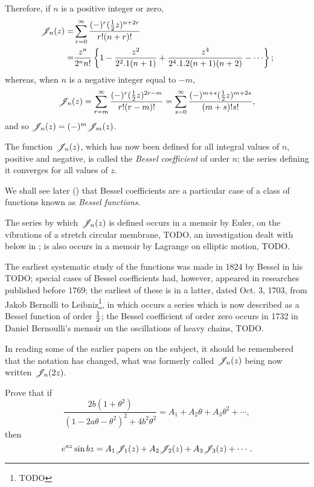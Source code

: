 \documentclass{book}
\begin{document}
Therefore, if $n$ is a positive integer or zero, 
\begin{align*}
\besJ_n(z) =& \sum_{r=0}^{\infty} \frac{ (-)^r (\half z)^{n+2r} }{
  r!(n+r)! } \\
=& \frac{ z^n }{ 2^n n! } 
\thebrace{ 1 - \frac{z^2}{2^2.1(n+1)} + \frac{z^4}{2^4.1.2(n+1)(n+2)}
  - \cdots };
\end{align*}
%
%
whereas, when $n$ is a negative integer equal to $-m$,
$$
\mathscr{J}_n(z)
= \sum_{r=m}^{\infty} \frac{ (-)^r (\frac{1}{2} z)^{2r-m} }{ r!(r-m)!  }
  = \sum_{s=0}^{\infty} \frac{ (-)^{m+s} (\frac{1}{2} z)^{m+2s}  }{ (m+s)! s!  },
  $$
  and so $\mathscr{J}_n(z) = (-)^m \mathscr{J}_m(z)$.

The function $\mathscr{J}_n(z)$, which has now been defined for all integral
values of $n$, positive and negative, is called the
\emph{Bessel coefficient} of order $n$; the series defining it 
converges for all values of $z$.

We shall see later () that Bessel
coefficients are a particular case of a class of functions known as
\emph{Bessel functions}.

The series by which $\mathscr{J}_n(z)$ is defined occurs in a memoir by Euler,
on the vibrations of a stretch circular membrane, TODO, 
an investigation dealt with below in ;
is also occurs in a memoir by Lagrange on elliptic motion, TODO.

The earliest systematic study of the functions was made in 1824 by
Bessel in his TODO; special cases of Bessel coefficients had, however,
appeared in researches published before 1769; the earliest of these is
in a latter, dated Oct. 3, 1703, from Jakob Bernolli to
Leibniz\footnote{TODO}, in which occurs a series which is now
described as a Bessel function of order $\frac{1}{2}$; the Bessel
coefficient of order zero occurs in 1732 in Daniel Bernoulli's memoir
on the oscillations of heavy chains, TODO.

In reading some of the earlier papers on the subject, it should be
remembered that the notation has changed, what was formerly called
$\mathscr{J}_n(z)$ being now written $\mathscr{J}_n(2z)$.
\begin{wandwexample}
Prove that if 
$$
\frac{ 2b(1+\theta^2)  }{ (1-2a\theta-\theta^2)^2 + 4b^2\theta^2  }
=
A_1 + A_2 \theta + A_3 \theta^2 + \cdots,
$$
then
$$
e^{az} \sin bz 
=
A_1 \mathscr{J}_1(z) + A_2 \mathscr{J}_2(z) + A_3 \mathscr{J}_3(z) + \cdots.
$$
\end{wandwexample}
\end{document}
